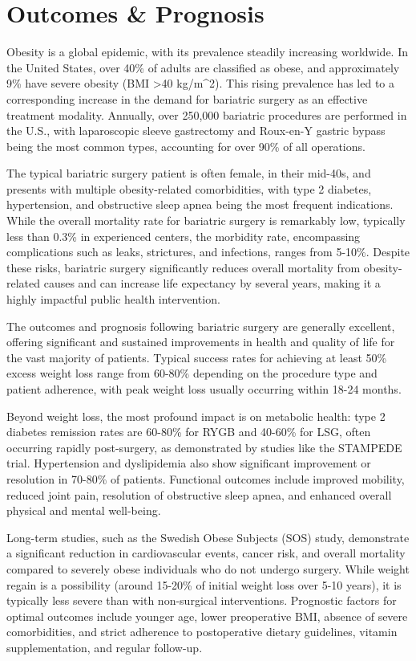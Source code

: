 \section*{Outcomes \& Prognosis}
Obesity is a global epidemic, with its prevalence steadily increasing worldwide. In the United States, over 40\% of adults are classified as obese, and approximately 9\% have severe obesity (BMI \textgreater{}40 kg/m\textasciicircum2). This rising prevalence has led to a corresponding increase in the demand for bariatric surgery as an effective treatment modality. Annually, over 250,000 bariatric procedures are performed in the U.S., with laparoscopic sleeve gastrectomy and Roux-en-Y gastric bypass being the most common types, accounting for over 90\% of all operations. 

The typical bariatric surgery patient is often female, in their mid-40s, and presents with multiple obesity-related comorbidities, with type 2 diabetes, hypertension, and obstructive sleep apnea being the most frequent indications. While the overall mortality rate for bariatric surgery is remarkably low, typically less than 0.3\% in experienced centers, the morbidity rate, encompassing complications such as leaks, strictures, and infections, ranges from 5-10\%. Despite these risks, bariatric surgery significantly reduces overall mortality from obesity-related causes and can increase life expectancy by several years, making it a highly impactful public health intervention.

The outcomes and prognosis following bariatric surgery are generally excellent, offering significant and sustained improvements in health and quality of life for the vast majority of patients. Typical success rates for achieving at least 50\% excess weight loss range from 60-80\% depending on the procedure type and patient adherence, with peak weight loss usually occurring within 18-24 months. 

Beyond weight loss, the most profound impact is on metabolic health: type 2 diabetes remission rates are 60-80\% for RYGB and 40-60\% for LSG, often occurring rapidly post-surgery, as demonstrated by studies like the STAMPEDE trial. Hypertension and dyslipidemia also show significant improvement or resolution in 70-80\% of patients. Functional outcomes include improved mobility, reduced joint pain, resolution of obstructive sleep apnea, and enhanced overall physical and mental well-being. 

Long-term studies, such as the Swedish Obese Subjects (SOS) study, demonstrate a significant reduction in cardiovascular events, cancer risk, and overall mortality compared to severely obese individuals who do not undergo surgery. While weight regain is a possibility (around 15-20\% of initial weight loss over 5-10 years), it is typically less severe than with non-surgical interventions. Prognostic factors for optimal outcomes include younger age, lower preoperative BMI, absence of severe comorbidities, and strict adherence to postoperative dietary guidelines, vitamin supplementation, and regular follow-up.

